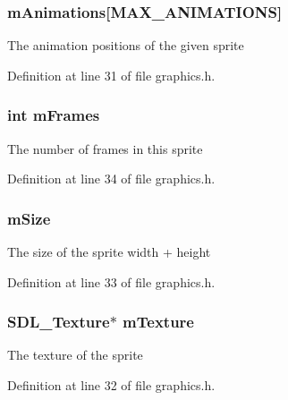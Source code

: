\subsubsection[{\texorpdfstring{m\+Animations}{mAnimations}}]{ m\+Animations\mbox{[}{\bf M\+A\+X\+\_\+\+A\+N\+I\+M\+A\+T\+I\+O\+NS}\mbox{]}}\hypertarget{structsprite__s_a8ce6c2916d6244600c434144ed6ac296}{}\label{structsprite__s_a8ce6c2916d6244600c434144ed6ac296}
The animation positions of the given sprite 

Definition at line 31 of file graphics.\+h.

\subsubsection[{\texorpdfstring{m\+Frames}{mFrames}}]{\setlength{\rightskip}{0pt plus 5cm}int m\+Frames}\hypertarget{structsprite__s_acd9c3d76b8dfc0aed0c331ec5f0568f1}{}\label{structsprite__s_acd9c3d76b8dfc0aed0c331ec5f0568f1}
The number of frames in this sprite 

Definition at line 34 of file graphics.\+h.

\subsubsection[{\texorpdfstring{m\+Size}{mSize}}]{ m\+Size}\hypertarget{structsprite__s_a94c822928b0483a24e1f4a176f161954}{}\label{structsprite__s_a94c822928b0483a24e1f4a176f161954}
The size of the sprite width + height 

Definition at line 33 of file graphics.\+h.

\subsubsection[{\texorpdfstring{m\+Texture}{mTexture}}]{\setlength{\rightskip}{0pt plus 5cm}S\+D\+L\+\_\+\+Texture$\ast$ m\+Texture}\hypertarget{structsprite__s_a13441ecc6f09930e330ecc4b48189778}{}\label{structsprite__s_a13441ecc6f09930e330ecc4b48189778}
The texture of the sprite 

Definition at line 32 of file graphics.\+h.

